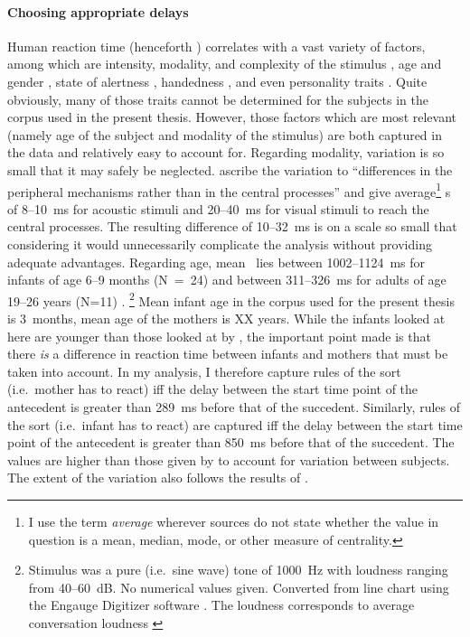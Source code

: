 \paragraph{Choosing appropriate delays}
Human reaction time (henceforth \rt) correlates with a vast variety of factors, among which are intensity, modality, and complexity of the stimulus \citep{brebner80}, age and gender \citep{der06}, state of alertness \citep{appelle74}, handedness \citep{dane03}, and even personality traits \citep{stelmack93}. Quite obviously, many of those traits cannot be determined for the subjects in the corpus used in the present thesis. However, those factors which are most relevant (namely age of the subject and modality of the stimulus) are both captured in the data and relatively easy to account for. Regarding modality, variation is so small that it may safely be neglected. \citet[]{brebner80} ascribe the variation to ``differences in the peripheral mechanisms rather than in the central processes'' and give average\footnote{I use the term \emph{average} wherever sources do not state whether the value in question is a mean, median, mode, or other measure of centrality.} \rt s of 8--10~ms for acoustic stimuli and 20--40~ms for visual stimuli to reach the central processes. The resulting difference of 10--32~ms is on a scale so small that considering it would unnecessarily complicate the analysis without providing adequate advantages. Regarding age, mean \rt\ lies  between 1002--1124~ms for infants of age 6--9 months (N~=~24) and between 311--326~ms for adults of age 19--26 years (N=11) \citep[]{leibold02}.%
\footnote{Stimulus was a pure (i.e.~sine wave) tone of 1000~Hz with loudness ranging from 40--60~dB. No numerical values given. Converted from line chart using the Engauge Digitizer software \citep{mitchell02}. The loudness corresponds to average conversation loudness \citep[]{goerne06}} 
Mean infant age in the corpus used for the present thesis is 3~months, mean age of the mothers is XX years. While the infants looked at here are younger than those looked at by \citet{leibold02}, the important point made is that there \emph{is} a difference in reaction time between infants and mothers that must be taken into account. In my analysis, I therefore capture rules of the sort  (i.e.~mother has to react) iff the delay between the start time point of the antecedent is greater than 289~ms before that of the succedent. Similarly, rules of the sort  (i.e.~infant has to react) are captured iff the delay between the start time point of the antecedent is greater than 850~ms before that of the succedent. The values are higher than those given by \citet{leibold02} to account for variation between subjects. The extent of the variation also follows the results of \citet{leibold02}.

